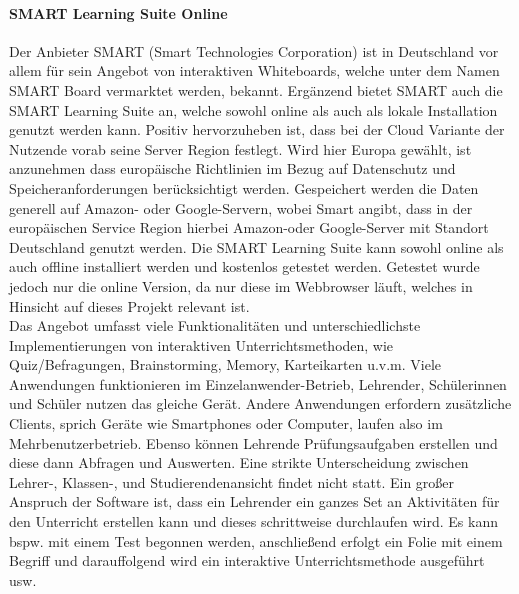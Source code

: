 \paragraph{SMART Learning Suite Online}
Der Anbieter SMART (Smart Technologies Corporation) ist in Deutschland vor allem für sein Angebot von interaktiven Whiteboards, welche unter dem Namen SMART Board vermarktet werden, bekannt. Ergänzend bietet SMART auch die SMART Learning Suite an, welche sowohl online als auch als lokale Installation genutzt werden kann. Positiv hervorzuheben ist, dass bei der Cloud Variante der Nutzende vorab seine Server Region festlegt. Wird hier Europa gewählt, ist anzunehmen dass europäische Richtlinien im Bezug auf Datenschutz und Speicheranforderungen berücksichtigt werden. Gespeichert werden die Daten generell auf Amazon- oder Google-Servern, wobei Smart angibt, dass in der europäischen Service Region hierbei Amazon-oder Google-Server mit Standort Deutschland genutzt werden\cite{Technologies2019}. Die SMART Learning Suite kann sowohl online als auch offline installiert werden und kostenlos getestet werden. Getestet wurde jedoch nur die online Version, da nur diese im Webbrowser läuft, welches in Hinsicht auf dieses Projekt relevant ist. \\ Das Angebot umfasst viele Funktionalitäten und unterschiedlichste Implementierungen von  interaktiven Unterrichtsmethoden, wie Quiz/Befragungen, Brainstorming, Memory, Karteikarten u.v.m. Viele Anwendungen funktionieren im Einzelanwender-Betrieb, Lehrender, Schülerinnen und Schüler nutzen das gleiche Gerät. Andere Anwendungen erfordern zusätzliche Clients, sprich Geräte wie Smartphones oder Computer, laufen also im Mehrbenutzerbetrieb. Ebenso können Lehrende Prüfungsaufgaben erstellen und diese dann Abfragen und Auswerten. Eine strikte Unterscheidung zwischen Lehrer-, Klassen-, und Studierendenansicht findet nicht statt. Ein großer Anspruch der Software ist, dass ein Lehrender ein ganzes Set an Aktivitäten für den Unterricht erstellen kann und dieses schrittweise durchlaufen wird. Es kann bspw. mit einem Test begonnen werden, anschließend erfolgt ein Folie mit einem Begriff und darauffolgend wird ein interaktive Unterrichtsmethode ausgeführt usw. 

